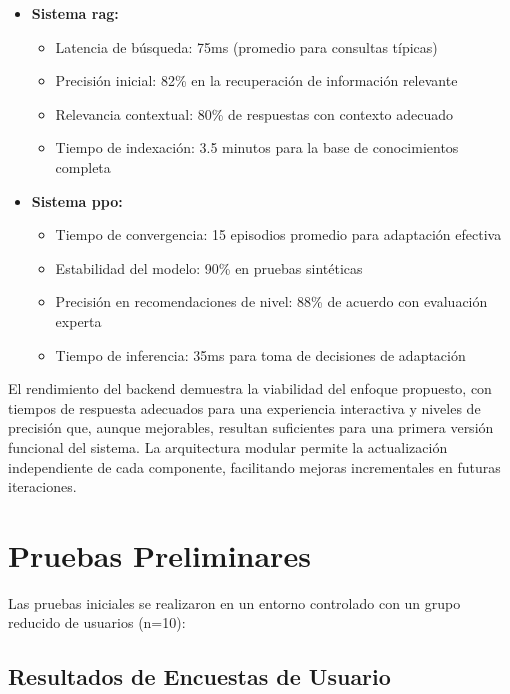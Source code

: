 \begin{itemize}
    \item \textbf{Sistema \gls{rag}:}
    \begin{itemize}
        \item Latencia de búsqueda: 75ms (promedio para consultas típicas)
        \item Precisión inicial: 82\% en la recuperación de información relevante
        \item Relevancia contextual: 80\% de respuestas con contexto adecuado
        \item Tiempo de indexación: 3.5 minutos para la base de conocimientos completa
    \end{itemize}

    \item \textbf{Sistema \gls{ppo}:}
    \begin{itemize}
        \item Tiempo de convergencia: 15 episodios promedio para adaptación efectiva
        \item Estabilidad del modelo: 90\% en pruebas sintéticas
        \item Precisión en recomendaciones de nivel: 88\% de acuerdo con evaluación experta
        \item Tiempo de inferencia: 35ms para toma de decisiones de adaptación
    \end{itemize}
\end{itemize}

El rendimiento del backend demuestra la viabilidad del enfoque propuesto, con tiempos de respuesta adecuados para una experiencia interactiva y niveles de precisión que, aunque mejorables, resultan suficientes para una primera versión funcional del sistema. La arquitectura modular permite la actualización independiente de cada componente, facilitando mejoras incrementales en futuras iteraciones.


\section{Pruebas Preliminares}
\label{pruebas-preliminares}

Las pruebas iniciales se realizaron en un entorno controlado con un grupo reducido de usuarios (n=10):

\subsection{Resultados de Encuestas de Usuario}
\label{subsec:resultados_encuestas}

